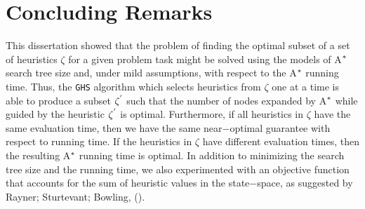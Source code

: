 
 
\chapter{Concluding Remarks}\label{ch:conclusions}

\iffalse
\chapterprecis{The purpose of this section is to introduce the meta-reasoning proposed.}\index{sinopse de capítulo}
\fi

\noindent
This dissertation showed that the problem of finding the optimal subset of a set of heuristics $\zeta$ for a given problem task might be solved using the models of A$\sp{*}$ search tree size and, under mild assumptions, with respect to the A$\sp{*}$ running time. Thus, the \texttt{GHS} algorithm which selects heuristics from $\zeta$ one at a time is able to produce a subset $\zeta\sp{'}$ such that the number of nodes expanded by A$\sp{*}$ while guided by the heuristic $\zeta\sp{'}$ is optimal. Furthermore, if all heuristics in $\zeta$ have the same evaluation time, then we have the same near$-$optimal guarantee with respect to running time. If the heuristics in $\zeta$ have different evaluation times, then the resulting A$\sp{*}$ running time is optimal. In addition to minimizing the search tree size and the running time, we also experimented with an objective function that accounts for the sum of heuristic values in the state$-$space, as suggested by Rayner; Sturtevant; Bowling, (\citeyear{raynersss13}).\\

